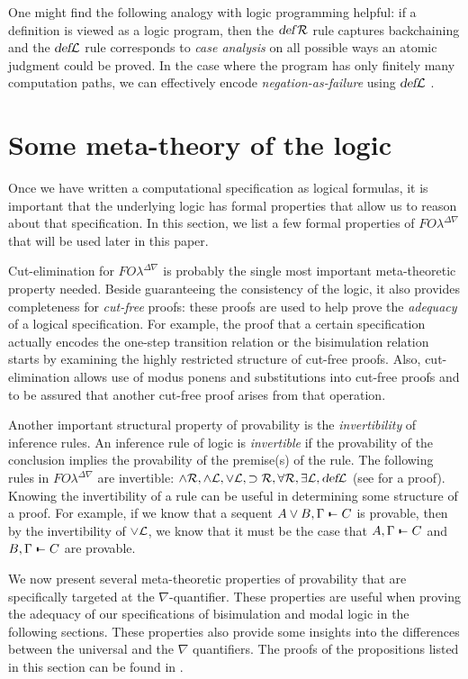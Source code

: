 \documentclass{acmtrans2m}
\def\relbar{\mathrel{\smash-}}
\def\joinrelm{\mathrel{\mkern-3.2mu}}
\def\tailpiece{\kern 1pt\vrule height 1ex width 0.3ex depth -.25ex}
\def\seqsym{\mathrel{\tailpiece\joinrelm\relbar}}
\newcommand{\FOL   }{FO\lambda}
\newcommand{\FOLDNb}{\FOL^{\Delta\nabla}}
\newcommand{\Seq}[2]{#1\seqsym #2}
\newcommand{\defL}{\hbox{\sl def}{\cal L}}
\newcommand{\defR}{\hbox{\sl def\/{}}{\cal R}}
\newcommand{\existsL}{\exists{\cal L}}
\newcommand{\forallR}{\forall{\cal R}}
\newcommand{\landL}{\land{\cal L}}
\newcommand{\landR}{\land{\cal R}}
\newcommand{\lorL}{\lor{\cal L}}
\newcommand{\oimpR}{\oimp{\cal R}}
\newcommand{\oimp}{\supset}
\begin{document}
One might find the following analogy with logic programming helpful:
if a definition is viewed as a logic program, then the $\defR$ rule
captures backchaining and the $\defL$ rule corresponds to {\em case
analysis} on all possible ways an atomic judgment could be proved.  In
the case where the program has only finitely many computation paths,
we can effectively encode {\em negation-as-failure} using $\defL$
\cite{hallnas91jlc}.


\section{Some meta-theory of the logic}
\label{sec:meta}

Once we have written a computational specification as logical
formulas, it is important that the underlying logic has 
formal properties that allow us to reason about that
specification.  In this section, we list a few formal properties of
$\FOLDNb$ that will be used later in this paper.

Cut-elimination for $\FOLDNb$ \cite{miller05tocl,tiu04phd} is probably
the single most important meta-theoretic property needed.  Beside
guaranteeing the consistency of the logic, it also provides
completeness for {\em cut-free} proofs: these proofs are 
used to help prove the {\em adequacy} of a logical specification.  For
example, the proof that a certain specification actually encodes the
one-step transition relation or the bisimulation relation starts by
examining the highly restricted structure of cut-free proofs.  Also,
cut-elimination allows use of modus ponens and substitutions into
cut-free proofs and to be assured that another cut-free proof arises
from that operation.

Another important structural property of provability is the {\em
invertibility} of inference rules.  An inference rule of logic is {\em
invertible} if the provability of the conclusion implies the
provability of the premise(s) of the rule.  The following rules in
$\FOLDNb$ are invertible: $\landR, \landL, \lorL, \oimpR, \forallR,
\existsL, \defL$ (see \cite{tiu04phd} for a proof).  Knowing the
invertibility of a rule can be useful in determining some structure of
a proof.  For example, if we know that a sequent $\Seq{A\lor B,
\Gamma}{C}$ is provable, then by the invertibility of $\lorL$, we know
that it must be the case that $\Seq{A,\Gamma}{C}$ and
$\Seq{B,\Gamma}{C}$ are provable.

We now present several meta-theoretic properties of provability that
are specifically targeted at the $\nabla$-quantifier.  These
properties are useful when proving the adequacy of our
specifications of bisimulation and modal logic in the following
sections.  These properties also provide some insights into
the differences between the universal and the $\nabla$ quantifiers.  The
proofs of the propositions listed in this section can be found in 
\cite{tiu04phd}.
\end{document}
